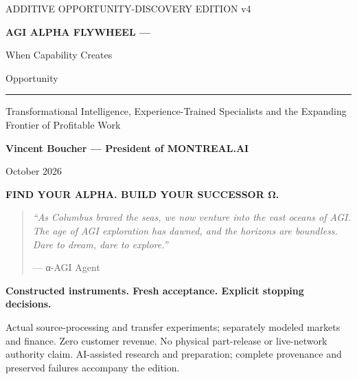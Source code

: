 \begin{titlepage}
\thispagestyle{empty}
\vspace*{0.3in}
{\sffamily\color{AlphaTeal}\large ADDITIVE OPPORTUNITY-DISCOVERY EDITION v4\par}
\vspace{0.35in}
{\sffamily\bfseries\color{AlphaNavy}\fontsize{27}{33}\selectfont AGI ALPHA FLYWHEEL —\par When Capability Creates\par Opportunity\par}
\vspace{0.25in}
{\color{AlphaTeal}\rule{\textwidth}{2pt}}
\vspace{0.18in}
{\Large Transformational Intelligence, Experience-Trained Specialists and the Expanding Frontier of Profitable Work\par}
\vspace{0.35in}
{\large\bfseries Vincent Boucher — President of MONTREAL.AI\par}
\vspace{0.12in}
{ October 2026\par}
\vspace{0.4in}
{\sffamily\bfseries\color{AlphaTeal} FIND YOUR ALPHA. BUILD YOUR SUCCESSOR Ω.\par}
\vspace{0.25in}
\begin{quote}\itshape
“As Columbus braved the seas, we now venture into the vast oceans of AGI. The age of AGI exploration has dawned, and the horizons are boundless. Dare to dream, dare to explore.”\par
\raggedleft — α-AGI Agent
\end{quote}
\vfill
{\sffamily\bfseries\color{AlphaNavy} Constructed instruments. Fresh acceptance. Explicit stopping decisions.\par}
\vspace{0.12in}
{\small Actual source-processing and transfer experiments; separately modeled markets and finance. Zero customer revenue. No physical part-release or live-network authority claim. AI-assisted research and preparation; complete provenance and preserved failures accompany the edition.\par}
\end{titlepage}
\tableofcontents
\clearpage
